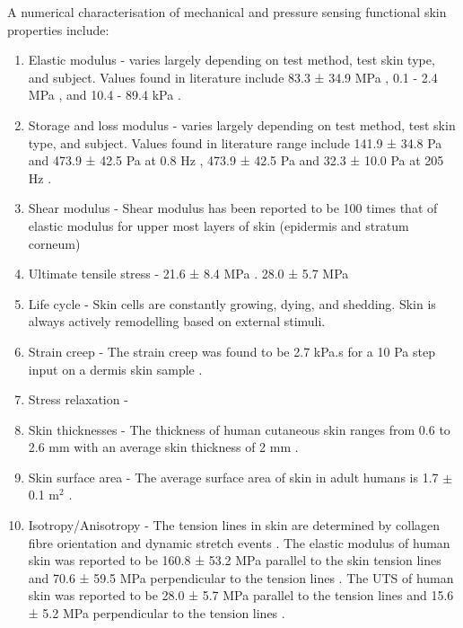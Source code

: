 A numerical characterisation of mechanical and pressure sensing functional skin properties include:
\begin{enumerate}
    \item Elastic modulus -  varies largely depending on test method, test skin type, and subject. Values found in literature include 83.3 ± 34.9 MPa \cite{Annaidh2012}, 0.1 - 2.4 MPa \cite{Khaothong2010}, and 10.4 - 89.4 kPa \cite{Zheng1999}.
    \item Storage and loss modulus - varies largely depending on test method, test skin type, and subject. Values found in literature range include 141.9 ± 34.8 Pa and 473.9 ± 42.5 Pa at 0.8 Hz \cite{Holt2008}, 473.9 ± 42.5 Pa and 32.3 ± 10.0 Pa at 205 Hz \cite{Parvini2022}.
    \item Shear modulus - Shear modulus has been reported to be 100 times that of elastic modulus for upper most layers of skin (epidermis and stratum corneum) \cite{Geerligs2010}
    \item Ultimate tensile stress - 21.6 ± 8.4 MPa \cite{Annaidh2012}. 28.0 ± 5.7 MPa \cite{Ottenio2015}
    \item Life cycle - Skin cells are constantly growing, dying, and shedding. Skin is always actively remodelling based on external stimuli.
    \item Strain creep - The strain creep was found to be 2.7 kPa.s for a 10 Pa step input on a dermis skin sample \cite{Holt2008}.
    \item Stress relaxation - 
    \item Skin thicknesses - The thickness of human cutaneous skin ranges from 0.6 to 2.6 mm with an average skin thickness of 2 mm \cite{Landry2021}.
    \item Skin surface area - The average surface area of skin in adult humans is 1.7 $\pm$ 0.1 m$^2$ \cite{Landry2021}.
    \item Isotropy/Anisotropy - The tension lines in skin are determined by collagen fibre orientation and dynamic stretch events \cite{Newell2007,Paul2018}. The elastic modulus of human skin was reported to be 160.8 ± 53.2 MPa parallel to the skin tension lines and 70.6 ± 59.5 MPa perpendicular to the tension lines \cite{Ottenio2015}. The UTS of human skin was reported to be 28.0 ± 5.7 MPa parallel to the tension lines and 15.6 ± 5.2 MPa perpendicular to the tension lines \cite{Ottenio2015}.    
\end{enumerate}

